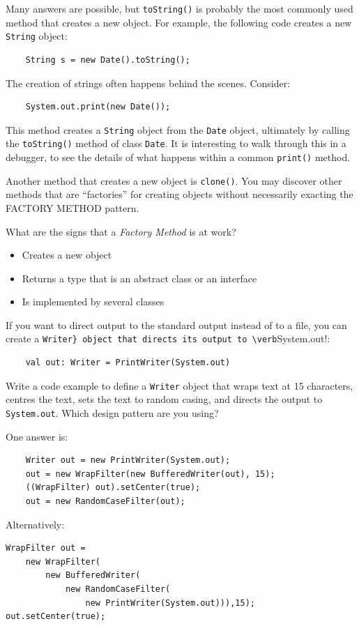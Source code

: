 \documentclass[answers,12pt,a4paper]{exam}
\begin{document}
\begin{questions}
\begin{solution}
Many answers are possible, but \verb!toString()! is probably the most commonly used method 
that creates a new object. For example, the following code creates a new \verb!String! object:
\begin{Verbatim}
	String s = new Date().toString();
\end{Verbatim}
The creation of strings often happens behind the scenes. Consider:
\begin{Verbatim}
	System.out.print(new Date());
\end{Verbatim}	
This method creates a \verb!String! object from the \verb!Date! object, 
ultimately by calling the \verb!toString()! method of class \verb!Date!. 
It is interesting to walk through this in a debugger, to see the details of what happens 
within a common \verb!print()! method.

Another method that creates a new object is \verb!clone()!. 
You may discover other methods that are ``factories'' 
for creating objects without necessarily exacting the \textsc{FACTORY METHOD} pattern.	
\end{solution}

\question 
What are the signs that a \emph{Factory Method} is at work?

\begin{solution}
\begin{itemize}
\item Creates a new object
\item Returns a type that is an abstract class or an interface
\item Is implemented by several classes	
\end{itemize}	
\end{solution}

\question %
If you want to direct output to the standard output instead of to a file, 
you can create a \verb!Writer} object that directs its output to \verb!System.out!:
\begin{Verbatim}
	val out: Writer = PrintWriter(System.out)
\end{Verbatim}	
Write a code example to define a \verb!Writer! object that wraps text at 15 characters, 
centres the text, sets the text to random casing, and directs the output to \verb!System.out!.
Which design pattern are you using?

\begin{solution}
One answer is:
\begin{Verbatim}
	Writer out = new PrintWriter(System.out);
	out = new WrapFilter(new BufferedWriter(out), 15);
	((WrapFilter) out).setCenter(true);
	out = new RandomCaseFilter(out);
\end{Verbatim}	
Alternatively:
\begin{Verbatim}
WrapFilter out =
    new WrapFilter(
        new BufferedWriter(
            new RandomCaseFilter(
                new PrintWriter(System.out))),15);
out.setCenter(true);	
\end{Verbatim}     
\end{solution}           
\end{questions}
\end{document}
